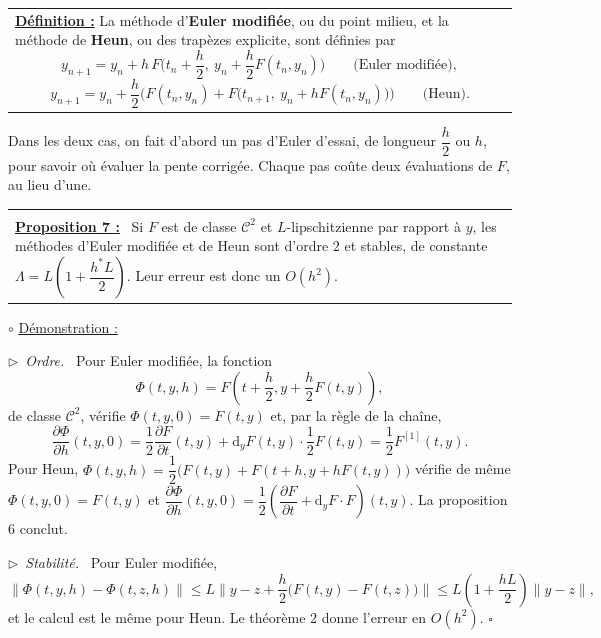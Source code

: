 \documentclass[a4paper,twoside]{report}
\makeatletter
\newcommand{\mot}[1]{\textcolor{rougecours}{\textbf{#1}}}
\newenvironment{cadre}%
 {\par\vspace{2mm}\noindent\begin{tabular}{|@{\hspace{4mm}}p{0.93\textwidth}@{\hspace{4mm}}|}
  \hline \\[-2mm]}%
 {\\[2mm] \hline \end{tabular}\par\vspace{3mm}}
\newcommand{\propo}[1]{\textbf{\underline{Proposition #1 :}}~}
\newenvironment{demo}%
 {\par\needspace{4\baselineskip}\vspace{1mm}\noindent$\circ$ \underline{Démonstration :}~\setlength{\parskip}{3pt plus 1pt}}%
 {\hfill$\square$\par\vspace{2mm}}
\newcommand{\etape}[1]{\par\smallskip\noindent$\triangleright$~\textit{#1}~}
\newcommand{\dd}{\mathrm{d}}                      %
\newcommand{\norme}[1]{\lVert #1 \rVert}         %
\newcommand{\Cc}{\mathcal{C}}                     %
\newcommand{\dpd}[2]{\dfrac{\partial #1}{\partial #2}}  %
\makeatother
\begin{document}
\begin{center}
\begin{tabularx}{15cm}{||X}
\noindent \textbf{\underline{Définition :}} La méthode d'\mot{Euler modifiée}, ou du point milieu, et la méthode de \mot{Heun}, ou des trapèzes explicite, sont définies par
\[ y_{n + 1} = y_{n} + h\,F\Big(t_{n} + \frac{h}{2},\ y_{n} + \frac{h}{2}F(t_{n}, y_{n})\Big) \qquad \text{(Euler modifiée)}, \]
\[ y_{n + 1} = y_{n} + \frac{h}{2}\Big(F(t_{n}, y_{n}) + F\big(t_{n + 1},\ y_{n} + hF(t_{n}, y_{n})\big)\Big) \qquad \text{(Heun)}. \]
\end{tabularx}
\end{center}

\noindent Dans les deux cas, on fait d'abord un pas d'Euler d'essai, de longueur $\dfrac{h}{2}$ ou $h$, pour savoir où évaluer la pente corrigée. Chaque pas coûte deux évaluations de $F$, au lieu d'une.

\begin{cadre}
\propo{7} Si $F$ est de classe $\Cc^{2}$ et $L$-lipschitzienne par rapport à $y$, les méthodes d'Euler modifiée et de Heun sont d'ordre $2$ et stables, de constante $\Lambda = L\left(1 + \dfrac{h^{*}L}{2}\right)$. Leur erreur est donc un $O(h^{2})$.
\end{cadre}

\begin{demo}
\etape{Ordre.} Pour Euler modifiée, la fonction
\[ \Phi(t, y, h) = F\left(t + \frac{h}{2}, y + \frac{h}{2}F(t, y)\right), \]
de classe $\Cc^{2}$, vérifie $\Phi(t, y, 0) = F(t, y)$ et, par la règle de la chaîne,
\[ \dpd{\Phi}{h}(t, y, 0) = \frac{1}{2}\dpd{F}{t}(t, y) + \dd_{y}F(t, y) \cdot \frac{1}{2}F(t, y) = \frac{1}{2}F^{[1]}(t, y). \]
Pour Heun, $\Phi(t, y, h) = \dfrac{1}{2}\big(F(t, y) + F(t + h, y + hF(t, y))\big)$ vérifie de même $\Phi(t, y, 0) = F(t, y)$ et $\dpd{\Phi}{h}(t, y, 0) = \dfrac{1}{2}\left(\dpd{F}{t} + \dd_{y}F \cdot F\right)(t, y)$. La proposition 6 conclut.

\etape{Stabilité.} Pour Euler modifiée,
\[ \norme{\Phi(t, y, h) - \Phi(t, z, h)} \leqslant L\Big\|y - z + \frac{h}{2}\big(F(t, y) - F(t, z)\big)\Big\| \leqslant L\left(1 + \frac{hL}{2}\right)\norme{y - z}, \]
et le calcul est le même pour Heun. Le théorème 2 donne l'erreur en $O(h^{2})$.
\end{demo}
\end{document}
